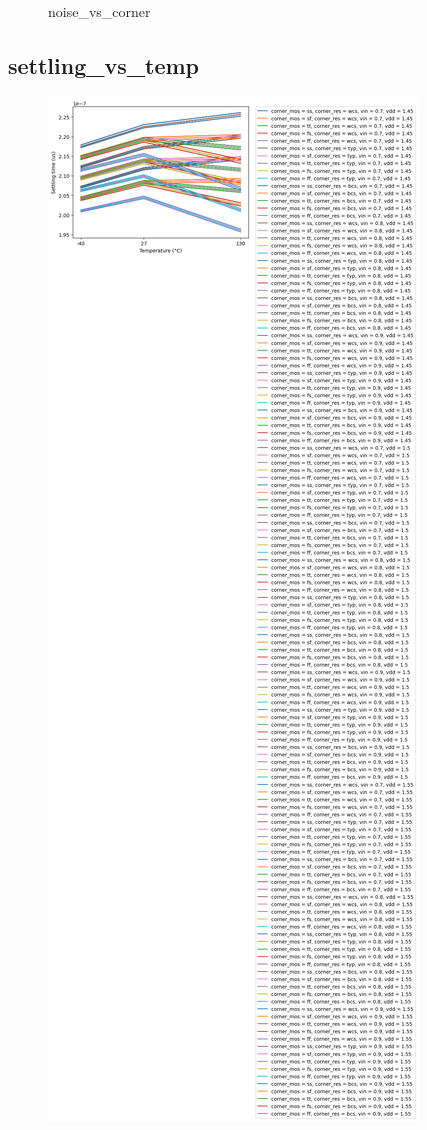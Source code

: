 \documentclass[
  a4paper,
  DIV=11,
  numbers=noendperiod]{scrartcl}
\begin{document}
\begin{tcolorbox}
\begin{figure}[H]
{}

\caption{noise\_vs\_corner}

\end{figure}%

\subsection*{settling\_vs\_temp}\label{settling_vs_temp-1}

\begin{figure}[H]

{\centering \includegraphics{./cace/_docs/ota-improved/schematic/settling_vs_temp.png}

}
\end{figure}
\end{tcolorbox}
\end{document}

